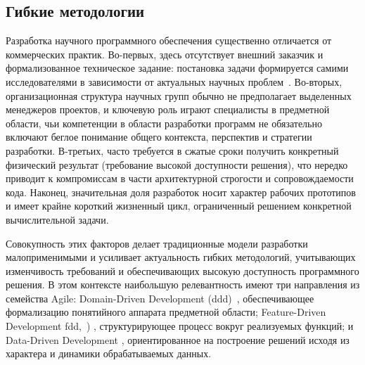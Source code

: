 \subsection{Гибкие методологии}

Разработка научного программного обеспечения существенно отличается от
коммерческих практик. Во-первых, здесь отсутствует внешний заказчик
и формализованное техническое задание: постановка задачи формируется
самими исследователями в зависимости от актуальных научных
проблем~\cite{software-for-science-CarverEtAl2016}.
Во-вторых, организационная структура научных групп обычно не
предполагает выделенных менеджеров проектов, и ключевую роль играют
специалисты в предметной области, чьи компетенции в области
разработки программ не обязательно включают беглое понимание
общего контекста, перспектив и стратегии разработки.
В-третьих, часто требуется в сжатые сроки получить конкретный
физический результат (требование высокой доступности решения),
что нередко приводит к компромиссам
в части архитектурной строгости и сопровождаемости кода. Наконец,
значительная доля разработок носит характер рабочих прототипов и
имеет крайне короткий жизненный цикл, ограниченный решением
конкретной вычислительной задачи.

Совокупность этих факторов делает традиционные модели разработки
малоприменимыми и усиливает актуальность гибких методологий,
учитывающих изменчивость требований и обеспечивающих
высокую доступность программного решения. В этом контексте
наибольшую релевантность имеют
три направления из семейства Agile: Domain-Driven Development %
(\acrshort{ddd})~\cite{vernon-DDD},
обеспечивающее формализацию понятийного аппарата предметной
области; Feature-Driven Development \acrshort{fdd},~\cite{coad1999java-fdd})
, структурирующее процесс
вокруг реализуемых функций; и Data-Driven Development \cite{Treleaven1982ddd, llopis2009ddd},
ориентированное на построение решений исходя из характера и
динамики обрабатываемых данных.

